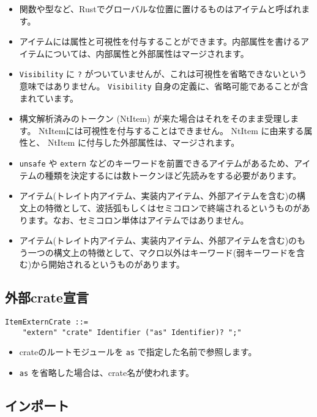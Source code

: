 \documentclass[dvipdfmx,uplatex,papersize,a4paper,10pt]{jsbook}
\theoremstyle{definition}
\begin{document}
\begin{itemize}
  \item 関数や型など、Rustでグローバルな位置に置けるものはアイテムと呼ばれます。
  \item アイテムには属性と可視性を付与することができます。内部属性を書けるアイテムについては、内部属性と外部属性はマージされます。
  \item \verb|Visibility| に \verb|?| がついていませんが、これは可視性を省略できないという意味ではありません。 \verb|Visibility| 自身の定義に、省略可能であることが含まれています。
  \item 構文解析済みのトークン (NtItem) が来た場合はそれをそのまま受理します。 NtItemには可視性を付与することはできません。 NtItem に由来する属性と、 NtItem に付与した外部属性は、マージされます。
  \item \verb|unsafe| や \verb|extern| などのキーワードを前置できるアイテムがあるため、アイテムの種類を決定するには数トークンほど先読みをする必要があります。
  \item アイテム(トレイト内アイテム、実装内アイテム、外部アイテムを含む)の構文上の特徴として、波括弧もしくはセミコロンで終端されるというものがあります。なお、セミコロン単体はアイテムではありません。
  \item アイテム(トレイト内アイテム、実装内アイテム、外部アイテムを含む)のもう一つの構文上の特徴として、マクロ以外はキーワード(弱キーワードを含む)から開始されるというものがあります。
\end{itemize}

\subsection{外部crate宣言}

\begin{lstlisting}[language=BNFLike, gobble=2]
  ItemExternCrate ::=
    "extern" "crate" Identifier ("as" Identifier)? ";"
\end{lstlisting}

\begin{itemize}
  \item crateのルートモジュールを \verb|as| で指定した名前で参照します。
  \item \verb|as| を省略した場合は、crate名が使われます。
\end{itemize}

\subsection{インポート}
\end{document}
